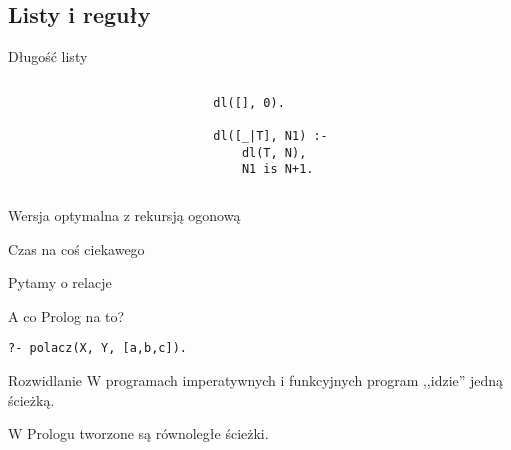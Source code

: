 \documentclass[blue]{beamer}
\begin{document}
\subsection{Listy i reguły}
\begin{frame}[fragile]{Długość listy}
\begin{columns}
\begin{column}{.5\linewidth}
\end{column}
\begin{column}{.5\linewidth}
\begin{lstlisting}
dl([], 0).

dl([_|T], N1) :-
    dl(T, N),
    N1 is N+1.
\end{lstlisting}
\end{column}
\end{columns}
\end{frame}
\begin{frame}[fragile]{Wersja optymalna z rekursją ogonową}

\end{frame}
\begin{frame}[fragile]{Czas na coś ciekawego}


Pytamy o relacje

A co Prolog na to?

\begin{lstlisting}
?- polacz(X, Y, [a,b,c]).
\end{lstlisting}
\end{frame}
\begin{frame}{Rozwidlanie}
W programach imperatywnych i funkcyjnych program ,,idzie'' jedną ścieżką.

W Prologu tworzone są równoległe ścieżki.

\end{frame}
\end{document}
